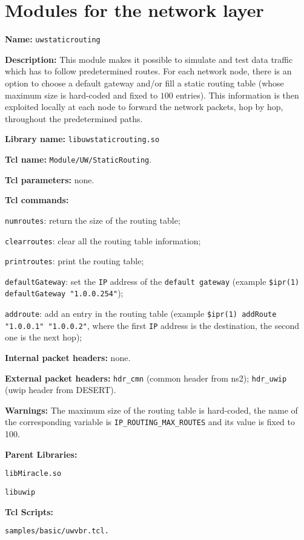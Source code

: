 \section{Modules for the network layer}\label{sec:network}

\begin{description}
   \item {\bf Name:} {\tt uwstaticrouting}
   \item {\bf Description:} This module makes it possible to simulate and test data traffic which has to follow predetermined routes. For each network node, there is an option to choose a default gateway and/or fill a static routing table (whose maximum size is hard-coded and fixed to $100$ entries). This information is then exploited locally at each node to forward the network packets, hop by hop, throughout the predetermined paths.
   \item {\bf Library name:} {\tt libuwstaticrouting.so}
   \item {\bf Tcl name:} {\tt Module/UW/StaticRouting}.
   \item {\bf Tcl parameters:} none.
   \item {\bf Tcl commands:}
   	\begin{description}
   	 \item {\tt numroutes}: return the size of the routing table;
   	 \item {\tt clearroutes}: clear all the routing table information;
 	 \item {\tt printroutes}: print the routing table;
 	 \item {\tt defaultGateway}: set the {\tt IP} address of the {\tt default gateway} (example {\tt \$ipr(1) defaultGateway "1.0.0.254"});
 	 \item {\tt addroute}: add an entry in the routing table (example {\tt \$ipr(1) addRoute "1.0.0.1" "1.0.0.2"}, where the first {\tt IP} address is the destination, the second one is the next hop);
 	\end{description}
   \item {\bf Internal packet headers:} none.
   \item {\bf External packet headers:} {\tt hdr\_cmn} (common header from ns2); {\tt hdr\_uwip} (uwip header from DESERT).
   \item {\bf Warnings:} The maximum size of the routing table is hard-coded, the name of the corresponding variable is {\tt IP\_ROUTING\_MAX\_ROUTES} and its value is fixed to 100.
   \item {\bf Parent Libraries:}
   \begin{description}
   \item {\tt libMiracle.so}
   \item {\tt libuwip}
   \end{description}
   \item {\bf Tcl Scripts:} 
   \begin{description}
   \item {\tt samples/basic/uwvbr.tcl.}
   \end{description}
\end{description}

